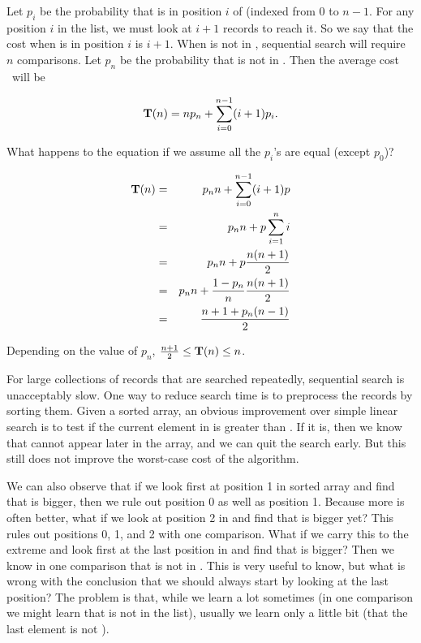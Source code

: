 Let $p_i$ be the probability that  is in position \(i\) of
 (indexed from 0 to \(n-1\).
For any position \(i\) in the list, we must look at \(i+1\) records to
reach it.
So we say that the cost when  is in position \(i\) is \(i+1\).
When  is not in , sequential search will require \(n\)
comparisons.
Let $p_n$ be the probability that  is not in .
Then the average cost \Tn\ will be

\[\mbox{$\textbf{T}(n)$} = n p_n + \sum_{i=0}^{n-1} (i+1) p_i.\]

\noindent What happens to the equation if we assume all the \(p_i\)'s
are equal (except \(p_0\))?

\begin{eqnarray*}
\mbox{$\textbf{T}(n)$} &=& p_n n + \sum_{i=0}^{n-1} (i+1) p\\
&=& p_n n + p\sum_{i=1}^n i\\
&=& p_n n + p\frac{n(n+1)}{2}\\
&=& p_n n + \frac{1 - p_n}{n}\frac{n(n+1)}{2}\\
&=& \frac{n + 1 + p_n(n-1)}{2}
\end{eqnarray*}

\noindent Depending on the value of \(p_n\),
\(\frac{n+1}{2} \leq \mbox{$\textbf{T}(n)$} \leq n\).

For large collections of records that are searched repeatedly,
sequential search is unacceptably slow.
One way to reduce search time is to preprocess the records by
sorting them.
Given a sorted array,
an obvious improvement over simple linear search is to test if the
current element in  is greater than .
If it is, then we know that  cannot appear later in the array,
and we can quit the search early.
But this still does not improve the worst-case cost of the algorithm.

We can also observe that if we look first at position 1 in sorted
array  and find that  is bigger, then we rule out
position 0 as well as position 1.
Because more is often better, what if we look at position 2 in
 and find that  is bigger yet?
This rules out positions 0, 1, and 2 with one comparison.
What if we carry this to the extreme and look first at the last
position in  and find that  is bigger?
Then we know in one comparison that  is not in .
This is very useful to know, but what is wrong with the conclusion
that we should always start by looking at the last position?
The problem is that, while we learn a lot sometimes (in one comparison
we might learn that  is not in the list), usually we learn
only a little bit (that the last element is not ).

